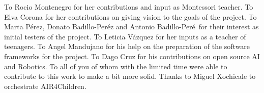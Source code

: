 \documentclass[sigconf]{acmart}
\begin{document}
\begin{acks}
To Rocio Montenegro for her contributions and input as Montessori teacher. 
To Elva Corona for her contributions on giving vision to the goals of the project. 
To Marta P\'erez, Donato Badillo-Per\'ez and Antonio Badillo-Per\'e\ for their interest as initial testers of the project. 
To Leticia V\'azquez for her inputs as a teacher of teenagers. 
To Angel Mandujano for his help on the preparation of the software frameworks for the project. 
To Dago Cruz for his contributions on open source AI and Robotics.
To all of you of whom with the limited time were able to contribute to this work to make a bit more solid.
Thanks to Miguel Xochicale to orchestrate AIR4Children.
\end{acks}



\end{document}
